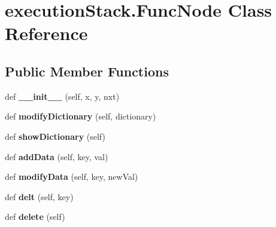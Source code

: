 \hypertarget{classexecution_stack_1_1_func_node}{}\section{execution\+Stack.\+Func\+Node Class Reference}
\label{classexecution_stack_1_1_func_node}
\subsection*{Public Member Functions}
\begin{DoxyCompactItemize}
\item 
def {\bfseries \+\_\+\+\_\+init\+\_\+\+\_\+} (self, x, y, nxt)\hypertarget{classexecution_stack_1_1_func_node_a1994532e3a182d99e343db96c08bd029}{}\label{classexecution_stack_1_1_func_node_a1994532e3a182d99e343db96c08bd029}

\item 
def {\bfseries modify\+Dictionary} (self, dictionary)\hypertarget{classexecution_stack_1_1_func_node_afb1bc84994052defe4aa69425ece9aaa}{}\label{classexecution_stack_1_1_func_node_afb1bc84994052defe4aa69425ece9aaa}

\item 
def {\bfseries show\+Dictionary} (self)\hypertarget{classexecution_stack_1_1_func_node_a05cb49985ef531aaaadc2745ba7824ed}{}\label{classexecution_stack_1_1_func_node_a05cb49985ef531aaaadc2745ba7824ed}

\item 
def {\bfseries add\+Data} (self, key, val)\hypertarget{classexecution_stack_1_1_func_node_af6781c8b076dd1640134f7a21b92a69e}{}\label{classexecution_stack_1_1_func_node_af6781c8b076dd1640134f7a21b92a69e}

\item 
def {\bfseries modify\+Data} (self, key, new\+Val)\hypertarget{classexecution_stack_1_1_func_node_ac68d3907e0cae5d0c6a8332f872898d3}{}\label{classexecution_stack_1_1_func_node_ac68d3907e0cae5d0c6a8332f872898d3}

\item 
def {\bfseries delt} (self, key)\hypertarget{classexecution_stack_1_1_func_node_ae5ea22451e43838d450dfdd5fc5c328f}{}\label{classexecution_stack_1_1_func_node_ae5ea22451e43838d450dfdd5fc5c328f}

\item 
def {\bfseries delete} (self)\hypertarget{classexecution_stack_1_1_func_node_a43cba9e7099e1cba625070fcb024bc84}{}\label{classexecution_stack_1_1_func_node_a43cba9e7099e1cba625070fcb024bc84}

\end{DoxyCompactItemize}
